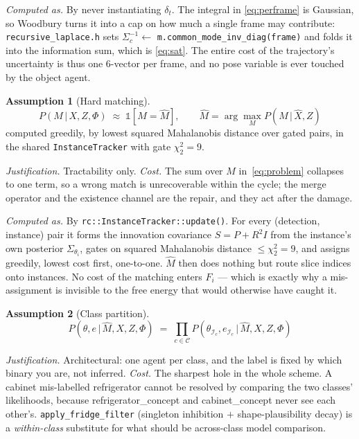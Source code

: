 \documentclass[11pt,a4paper]{report}
\newcommand{\given}{\,|\,}
\theoremstyle{definition}   %
\newtheorem{assumption}{Assumption}
\begin{document}
\smallskip\noindent\textit{Computed as.} By never instantiating $\delta_t$. The integral in \eqref{eq:perframe} is Gaussian, so Woodbury
turns it into a cap on how much a single frame may contribute: \texttt{recursive\_laplace.h} sets
$\Sigma_c^{-1}\leftarrow$ \texttt{m.common\_mode\_inv\_diag(frame)} and folds it into the
information sum, which is \eqref{eq:sat}. The entire cost of the trajectory's uncertainty is thus
one $6$-vector per frame, and no pose variable is ever touched by the object agent.

\begin{assumption}[Hard matching]\label{as:hard}
\begin{equation}
P(M\given X,Z,\Phi)\;\approx\;\mathbb{1}\!\left[M=\hat M\right],
\qquad
\hat M=\arg\max_M P(M\given \hat X,Z)
\end{equation}
computed greedily, by lowest squared Mahalanobis distance over gated pairs, in the shared
\texttt{InstanceTracker} with gate $\chi^2_2=9$.
\end{assumption}
\noindent\textit{Justification.} Tractability only. \textit{Cost.} The sum over $M$
in~\eqref{eq:problem} collapses to one term, so a wrong match is unrecoverable within the cycle;
the merge operator and the existence channel are the repair, and they act after the damage.


\smallskip\noindent\textit{Computed as.} By \texttt{rc::InstanceTracker::update()}. For every (detection, instance) pair it forms the
innovation covariance $S=P+R^2I$ from the instance's own posterior $\Sigma_{\theta_i}$, gates on
squared Mahalanobis distance $\le\chi^2_2=9$, and assigns greedily, lowest cost first, one-to-one.
$\hat M$ then does nothing but route slice indices onto instances. No cost of the matching enters
$F_i$ --- which is exactly why a mis-assignment is invisible to the free energy that would
otherwise have caught it.

\begin{assumption}[Class partition]\label{as:class}
\begin{equation}
P(\theta,e\given \hat M,X,Z,\Phi)\;=\;\prod_{c\in\mathcal{C}}
P\!\left(\theta_{\mathcal{I}_c},e_{\mathcal{I}_c}\given \hat M,X,Z,\Phi\right)
\end{equation}
\end{assumption}
\noindent\textit{Justification.} Architectural: one agent per class, and the label is fixed by
which binary you are, not inferred. \textit{Cost.} The sharpest hole in the whole scheme. A
cabinet mis-labelled \textsf{refrigerator} cannot be resolved by comparing the two classes'
likelihoods, because \textsf{refrigerator\_concept} and \textsf{cabinet\_concept} never see each
other's. \texttt{apply\_fridge\_filter} (singleton inhibition $+$ shape-plausibility decay) is a
\emph{within-class} substitute for what should be across-class model comparison.
\end{document}
